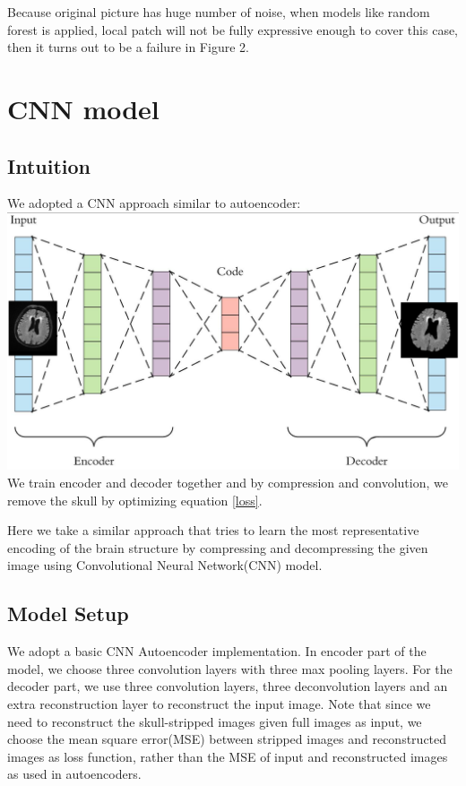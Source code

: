 \documentclass[conference]{IEEEtran}
\begin{document}
Because original picture has huge number of noise, when models like random forest is applied, local patch will not be fully expressive enough to cover this case, then it turns out to be a failure in Figure 2.

\section{CNN model}
\subsection*{Intuition}
We adopted a CNN approach similar to autoencoder:
\includegraphics[scale = 0.3]{Snipaste_2018-05-28_14-16-23.png}
We train encoder and decoder together and by compression and convolution, we remove the skull by optimizing equation \ref{loss}. 

Here we take a similar approach that tries to learn the most representative encoding of the brain structure by compressing and decompressing the given image using Convolutional Neural Network(CNN) model. 

\subsection*{Model Setup}
We adopt a basic CNN Autoencoder implementation. In encoder part of the model, we choose three convolution layers with three max pooling layers. For the decoder part, we use three convolution layers, three deconvolution layers and an extra reconstruction layer to reconstruct the input image. Note that since we need to reconstruct the skull-stripped images given full images as input, we choose the mean square error(MSE) between stripped images and reconstructed images as loss function, rather than the MSE of input and reconstructed images as used in autoencoders.
\end{document}
